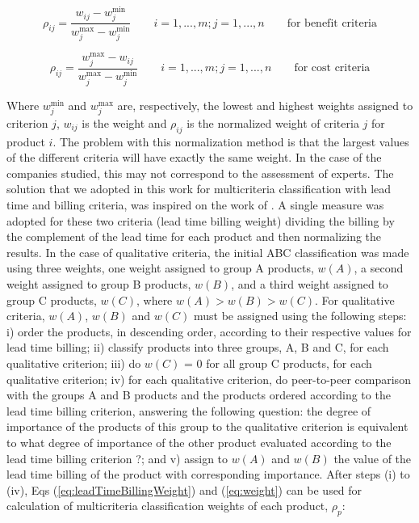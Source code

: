 \documentclass[10pt,fleqn,a4paper,twoside]{article}
\begin{document}
	\begin{equation}
		\rho_{ij} = \frac{w_{ij} - w_{j}^{\min}}{w_{j}^{\max} - w_{j}^{\min}} \qquad i=1,...,m; j = 1, ..., n \qquad \textrm{for benefit criteria}
	\end{equation}
	
	\begin{equation}
		\rho_{ij} = \frac{w_{j}^{\max} - w_{ij}}{w_{j}^{\max} - w_{j}^{\min}} \qquad i=1,...,m; j = 1, ..., n \qquad \textrm{for cost criteria}
	\end{equation}
	
	Where $w_{j}^{\min}$ and $w_{j}^{\max}$ are, respectively, the lowest and highest weights assigned to criterion $j$, $w_{ij}$ is the weight and $\rho_{ij}$ is the normalized weight of criteria $j$ for product $i$. The problem with this normalization method is that the largest values of the different criteria will have exactly the same weight. In the case of the companies studied, this may not correspond to the assessment of experts. The solution that we adopted in this work for multicriteria classification with lead time and billing criteria, was inspired on the work of \cite{Williams1984}. A single measure was adopted for these two criteria (lead time billing  weight) dividing the billing by the complement of the lead time for each product and then normalizing the results. In the case of qualitative criteria, the initial ABC classification was made using three weights, one weight assigned to group A products, $w(A)$, a second weight assigned to group B products, $w(B)$, and a third weight assigned to group C products, $w(C)$, where $w(A) > w(B) > w(C)$. For qualitative criteria, $w(A)$, $w(B)$ and $w(C)$ must be assigned using the following steps: i) order the products, in descending order, according to their respective values for lead time billing; ii) classify products into three groups, A, B and C, for each qualitative criterion; iii) do $w(C)$ = 0 for all group C products, for each qualitative criterion; iv) for each qualitative criterion, do peer-to-peer comparison with the groups A and B products and the products ordered according to the lead time billing criterion, answering the following question: the degree of importance of the products of this group to the qualitative criterion is equivalent to what degree of importance of the other product evaluated according to the lead time billing criterion ?; and v) assign to $w(A)$ and $w(B)$ the value of the lead time billing of the product with corresponding importance. After steps (i) to (iv), Eqs (\ref{eq:leadTimeBillingWeight}) and (\ref{eq:weight}) can be used for calculation of multicriteria classification weights of each product, $\rho_{p}$:
\end{document}
